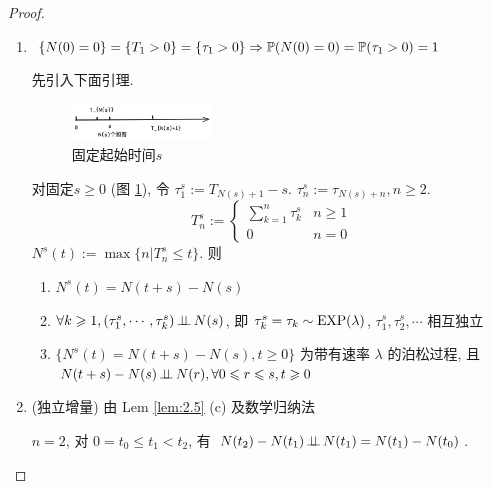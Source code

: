 \begin{proof}
\begin{enumerate}
    \item $\{N(0)=0\}=\{T_1>0\}=\{\tau_1>0\}\Rightarrow \mathbb{P}(N(0)=0)=\mathbb{P}(\tau_1>0)=1$
    
    先引入下面引理.
    \begin{figure}[H]
        \centering
        \includegraphics[width=0.35\textwidth]{figures/lem2-5.png}
        \caption{固定起始时间$s$}
        \label{fig:fixed-s}
    \end{figure}
\begin{lemma}[Lem 2.5']\label{lem:2.5}
    对固定$s\geq 0$ (图 \ref{fig:fixed-s}),
    令 $\tau_1^s:=T_{N(s)+1}-s$. $\tau_n^s:=\tau_{N(s)+n}, n\geq 2$.
    \[
    T_n^s:=\begin{cases}
        \sum_{k=1}^n\tau_k^s & n\geq 1\\
        0 & n=0
    \end{cases}
    \]
    $N^s(t):=\max\{n|T_n^s\leq t\}$. 则
    \begin{enumerate}
        \item $N^s(t)=N(t+s)-N(s)$
        \item $\forall k\geqslant 1, (\tau_1^s,\cdots,\tau_k^s)\operatorname{\perp\!\!\!\perp} N(s)$, 即 $\tau_k^s=\tau_k\sim \operatorname{EXP}(\lambda)$, $\tau_1^s, \tau_2^s, \cdots$ 相互独立
        \item $\{N^s(t)=N(t+s)-N(s),t\geq 0\}$ 为带有速率 $\lambda$ 的泊松过程, 且 $N(t+s)-N(s)\operatorname{\perp\!\!\!\perp} N(r), \forall 0\leqslant r\leqslant s,t\geqslant 0$
    \end{enumerate}
\end{lemma}
    \item (独立增量) 由 Lem \ref{lem:2.5} (c) 及数学归纳法
    
$n=2$, 对 $0=t_0\leq t_1<t_2$, 有 $N(t_2)-N(t_1)\operatorname{\perp\!\!\!\perp} N(t_1)=N(t_1)-N(t_0)$.
    

\end{enumerate}
\end{proof}
